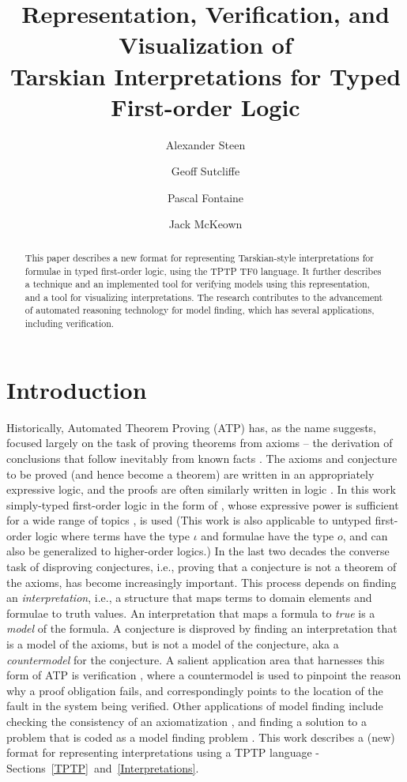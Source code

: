 \documentclass{easychair}
\title{Representation, Verification, and Visualization of\\
Tarskian Interpretations for Typed First-order Logic}
\author{
  Alexander Steen\inst{1}
\and
  Geoff Sutcliffe\inst{2}
\and
  Pascal Fontaine\inst{3}
\and
  Jack McKeown\inst{2} 
}
\institute{
  University of Greifswald,
  Greifswald, Germany\\
  \email{alexander.steen@uni-greifswald.de}
\and
  University of Miami,
  Miami, USA\\
  \email{geoff@cs.miami.edu,jam771@miami.edu}\\
\and
  University of Li{\`e}ge,
  Li{\`e}ge, Belgium\\
  \email{Pascal.Fontaine@uliege.be}\\
}
\begin{document}
\maketitle

\begin{abstract}
This paper describes a new format for representing Tarskian-style interpretations for formulae in 
typed first-order logic, using the TPTP TF0 language.
It further describes a technique and an implemented tool for verifying models using this
representation, and a tool for visualizing interpretations.
The research contributes to the advancement of automated reasoning technology for model finding, 
which has several applications, including verification.
\end{abstract}
\section{Introduction}
\label{Introduction}

Historically, Automated Theorem Proving (ATP) has, as the name suggests, focused largely on the
task of proving theorems from axioms -- the derivation of conclusions that follow inevitably 
from known facts \cite{RV01-HAR}.
The axioms and conjecture to be proved (and hence become a theorem) are written in an 
appropriately expressive logic, and the proofs are often similarly written in logic \cite{SS+06}.
In this work simply-typed first-order logic in the form of \cite{Wal83,Sch85,Coh87},
whose expressive power is sufficient for a wide range of topics \cite{Sut17}, is used
(This work is also applicable to untyped first-order logic
where terms have the type $\iota$ and formulae have the type $o$, 
and can also be generalized to higher-order logics.)
In the last two decades the converse task of disproving conjectures, i.e., proving that a 
conjecture is not a theorem of the axioms, has become increasingly important.
This process depends on finding an {\em interpretation}, i.e., a structure that maps terms 
to domain elements and formulae to truth values.
An interpretation that maps a formula to {\em true} is a {\em model} of the formula.
A conjecture is disproved by finding an interpretation that is a model of the axioms, but 
is not a model of the conjecture, aka a {\em countermodel} for the conjecture.
A salient application area that harnesses this form of ATP is verification \cite{DKW08},
where a countermodel is used to pinpoint the reason why a proof obligation fails, and
correspondingly points to the location of the fault in the system being verified.
Other applications of model finding include checking the consistency of an axiomatization 
\cite{SS+17}, and finding a solution to a problem that is coded as a model finding problem 
\cite{Win82}.
This work describes a (new) format for representing interpretations using a TPTP language -
Sections~\ref{TPTP}~and~\ref{Interpretations}.
\end{document}
